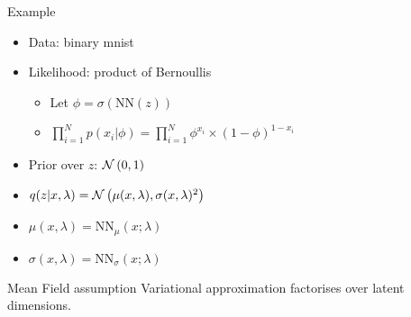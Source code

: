 \documentclass[14pt]{beamer}
\begin{document}
\begin{frame}{Example}
\begin{itemize}
\item Data: binary mnist
\item Likelihood: product of Bernoullis
\begin{itemize}
\item Let $ \phi = \sigma(\text{NN}(z)) $
\item $ \prod_{i=1}^{N} p(x_{i}|\phi) = \prod_{i=1}^{N} \phi^{x_{i}} \times (1-\phi)^{1-x_{i}} $
\end{itemize}
\item Prior over $ z $: $\mathcal{N}\left(0,1\right)$
\item $ q(z|x,\lambda) = \mathcal{N}\left(\mu(x,\lambda),\sigma(x,\lambda)^{2}\right) $
\item $ \mu(x, \lambda) = \text{NN}_{\mu}(x; \lambda) $
\item $ \sigma(x, \lambda) = \text{NN}_{\sigma}(x; \lambda) $
\end{itemize}
\pause
\begin{block}{Mean Field assumption}
Variational approximation factorises over latent dimensions.
\end{block}
\end{frame}
\end{document}
